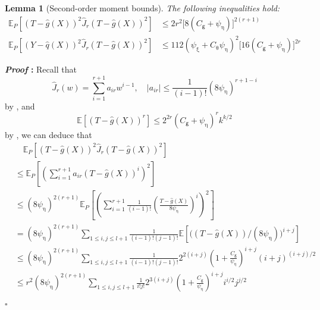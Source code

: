 \documentclass{article}
\newcommand{\E}{\mathbb{E}}
\newtheorem{lemma}{Lemma}[section]
\renewenvironment{proof}{\noindent\textbf{\textit{Proof }:}}{\hfill$\square$}
\begin{document}
\begin{lemma}[Second-order moment bounds]
\label{lemma:var-bound}
    The following inequalities hold:
    \begin{align}
        \E_{P}\left[ (T-\hat{g}(X))^2\hat{J}_r(T-\hat{g}(X))^2 \right] &\leq 2r^2 \big[8(C_{\mathsf{g}}+\psi_{\upeta})\big]^{2(r+1)} \label{eq:var-bound-T} \\
        \E_{P}\left[ (Y-\hat{q}(X))^2\hat{J}_r(T-\hat{g}(X))^2 \right] & \leq 112 (\psi_{\upxi}+C_{\uptheta}\psi_{\upeta})^2\big[16(C_{\mathsf{g}}+\psi_{\upeta})\big]^{2r} \label{eq:var-bound-Y}
    \end{align}
\end{lemma}

\begin{proof}
    Recall that
    \begin{equation}
        \label{eq:hat-J-l-recall}
        \hat{J}_r(w) = \sum_{i=1}^{r+1}a_{ir}w^{i-1},\quad |a_{ir}| \leq \frac{1}{(i-1)!}(8\psi_{\upeta})^{r+1-i}
    \end{equation}
    by , and
    \begin{equation}
        \label{eq:hat-g-moment-recall}
    \E\left[(T-\hat{g}(X))^r\right] \leq 2^{2r}(C_{\mathsf{g}}+\psi_{\upeta})^r k^{k/2}
    \end{equation}
    by , we can deduce that
    \begin{align}
        &\quad \E_{P}\left[ (T-\hat{g}(X))^2\hat{J}_r(T-\hat{g}(X))^2 \right] \nonumber \\
        &\leq  \E_{P}\left[ \left(\sum_{i=1}^{r+1}a_{ir}(T-\hat{g}(X))^i\right)^2 \right] \nonumber \\
        &\leq (8\psi_{\upeta})^{2(r+1)} \E_P\left[ \left(\sum_{i=1}^{r+1}\frac{1}{(i-1)!}\left(\frac{T-\hat{g}(X)}{8\psi_{\upeta}}\right)^i\right)^2 \right] \label{eq:var-bound-T-1} \\
        &= (8\psi_{\upeta})^{2(r+1)} \sum_{1\leq i,j \leq l+1} \frac{1}{(i-1)!(j-1)!} \E\left[ \big((T-\hat{g}(X))/(8\psi_{\upeta})\big)^{i+j} \right] \nonumber \\
        &\leq (8\psi_{\upeta})^{2(r+1)} \sum_{1\leq i,j \leq l+1} \frac{1}{(i-1)!(j-1)!} 2^{2(i+j)}\left(1+\frac{C_{\mathsf{g}}}{\psi_{\upeta}}\right)^{i+j} (i+j)^{(i+j)/2} \label{eq:var-bound-T-2} \\
        &\leq r^2 (8\psi_{\upeta})^{2(r+1)} \sum_{1\leq i,j \leq l+1} \frac{1}{i!j!} 2^{3(i+j)}\left(1+\frac{C_{\mathsf{g}}}{\psi_{\upeta}}\right)^{i+j} i^{i/2}j^{j/2} \label{eq:var-bound-T-3} \\

\end{align}
\end{proof}
\end{document}
